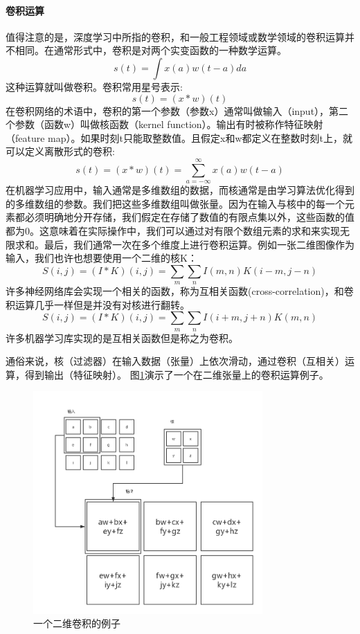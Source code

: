 \documentclass[12pt,a4paper,titlepage]{article}
\begin{document}
\paragraph{卷积运算}
值得注意的是，深度学习中所指的卷积，和一般工程领域或数学领域的卷积运算并不相同。在通常形式中，卷积是对两个实变函数的一种数学运算。
\[
s(t)=\int x(a)w(t-a)da
\]
这种运算就叫做卷积。卷积常用星号表示:
\[
s(t) = (x*w)(t)
\]
在卷积网络的术语中，卷积的第一个参数（参数x）通常叫做输入（input），第二个参数（函数w）叫做核函数（kernel function）。输出有时被称作特征映射（feature map）。如果时刻t只能取整数值。且假定x和w都定义在整数时刻t上，就可以定义离散形式的卷积:
\[
s(t) = (x*w)(t) = \sum_{a=-\infty}^{\infty}x(a)w(t-a)
\]
在机器学习应用中，输入通常是多维数组的数据，而核通常是由学习算法优化得到的多维数组的参数。我们把这些多维数组叫做张量。因为在输入与核中的每一个元素都必须明确地分开存储，我们假定在存储了数值的有限点集以外，这些函数的值都为0。这意味着在实际操作中，我们可以通过对有限个数组元素的求和来实现无限求和。最后，我们通常一次在多个维度上进行卷积运算。例如一张二维图像作为输入，我们也许也想要使用一个二维的核K：
\[
S(i,j) = (I*K)(i,j) = \sum_m\sum_nI(m,n)K(i-m,j-n)
\]
许多神经网络库会实现一个相关的函数，称为互相关函数(cross-correlation)，和卷积运算几乎一样但是并没有对核进行翻转。
\[
S(i,j) = (I*K)(i,j) = \sum_m\sum_nI(i+m,j+n)K(m,n)
\]
许多机器学习库实现的是互相关函数但是称之为卷积。

通俗来说，核（过滤器）在输入数据（张量）上依次滑动，通过卷积（互相关）运算，得到输出（特征映射）。
图\ref{fig:conv}演示了一个在二维张量上的卷积运算例子。
\begin{figure}[ht]

\centering
\includegraphics[height=8.5cm]{img/convolution.png}
\caption{一个二维卷积的例子}
\label{fig:conv}
\end{figure}
\end{document}
